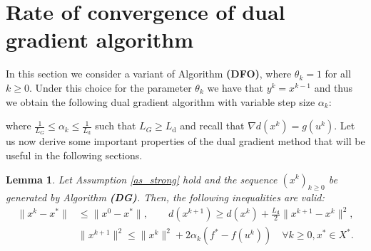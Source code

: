 \documentclass{gOMS2e}
\theoremstyle{plain}
\newtheorem{lemma}[theorem]{Lemma}
\theoremstyle{definition}
\theoremstyle{remark}
\begin{document}
\section{Rate of convergence of dual  gradient algorithm}
\label{sec_dfom} \noindent In this section we consider a variant of
Algorithm {\bf (DFO)}, where $\theta_k =1$ for all $k \geq 0$. Under
this choice for the parameter $\theta_k$ we have that $y^{k} =
x^{k-1}$ and thus we obtain the following dual gradient algorithm
with variable step size  $\alpha_k$:
\begin{center}
\end{center}
where $\frac{1}{L_G} \leq \alpha_k \leq \frac{1}{L_{\text{d}}}$ such
that $L_G \geq L_{\text{d}}$ and   recall that ${\nabla} d(x^k)=
g({}{u}^k)$. Let us now derive some important properties of the
dual gradient method that will be useful in the following sections.

\begin{lemma}
\label{lemma1_dg} Let Assumption \ref{as_strong} hold and the
sequence  $\left(x^k\right)_{k\geq 0}$ be generated by Algorithm
{\bf (DG)}. Then, the following inequalities are valid:
\begin{align*}
\|x^k - x^*\| & \leq \|x^0 - x^*\|,  \qquad  d(x^{k+1}) \geq d(x^k)
+\frac{L_\text{d}}{2} \| x^{k+1} - x^k \|^2, \\
& \|x^{k+1}\|^2 \leq \|x^k\|^2 + 2 \alpha_k (f^* - f(u^k)) \quad
\forall k \geq 0, x^* \in X^*.
\end{align*}
\end{lemma}
\end{document}
